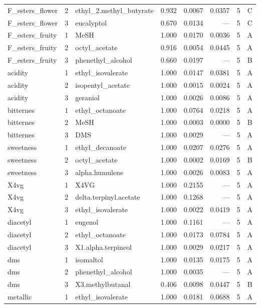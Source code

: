 \begin{longtable}{@{}p{} r p{} r r r r c@{}}
F\_esters\_flower & 2 & ethyl\_2.\allowbreak{}methyl\_butyrate & 0.932 & 0.0067 & 0.0357 & 5 & C \\
F\_esters\_flower & 3 & eucalyptol & 0.670 & 0.0134 & --- & 5 & C \\
F\_esters\_fruity & 1 & MeSH & 1.000 & 0.0170 & 0.0036 & 5 & A \\
F\_esters\_fruity & 2 & octyl\_acetate & 0.916 & 0.0054 & 0.0445 & 5 & A \\
F\_esters\_fruity & 3 & phenethyl\_alcohol & 0.660 & 0.0197 & --- & 5 & B \\
acidity & 1 & ethyl\_isovalerate & 1.000 & 0.0147 & 0.0381 & 5 & A \\
acidity & 2 & isopentyl\_acetate & 1.000 & 0.0015 & 0.0024 & 5 & A \\
acidity & 3 & geraniol & 1.000 & 0.0026 & 0.0086 & 5 & A \\
bitternes & 1 & ethyl\_octanoate & 1.000 & 0.0764 & 0.0218 & 5 & A \\
bitternes & 2 & MeSH & 1.000 & 0.0003 & 0.0000 & 5 & B \\
bitternes & 3 & DMS & 1.000 & 0.0029 & --- & 5 & A \\
sweetness & 1 & ethyl\_decanoate & 1.000 & 0.0207 & 0.0276 & 5 & A \\
sweetness & 2 & octyl\_acetate & 1.000 & 0.0002 & 0.0169 & 5 & B \\
sweetness & 3 & alpha.\allowbreak{}humulene & 1.000 & 0.0026 & 0.0083 & 5 & A \\
X4vg & 1 & X4VG & 1.000 & 0.2155 & --- & 5 & A \\
X4vg & 2 & delta.\allowbreak{}terpinyl.\allowbreak{}acetate & 1.000 & 0.1268 & --- & 5 & A \\
X4vg & 3 & ethyl\_isovalerate & 1.000 & 0.0022 & 0.0419 & 5 & A \\
diacetyl & 1 & eugenol & 1.000 & 0.1161 & --- & 5 & A \\
diacetyl & 2 & ethyl\_octanoate & 1.000 & 0.0173 & 0.0784 & 5 & A \\
diacetyl & 3 & X1.\allowbreak{}alpha.\allowbreak{}terpineol & 1.000 & 0.0029 & 0.0217 & 5 & A \\
dms & 1 & isomaltol & 1.000 & 0.0135 & 0.0175 & 5 & A \\
dms & 2 & phenethyl\_alcohol & 1.000 & 0.0035 & --- & 5 & A \\
dms & 3 & X3.\allowbreak{}methylbutanal & 0.406 & 0.0098 & 0.0447 & 5 & B \\
metallic & 1 & ethyl\_isovalerate & 1.000 & 0.0181 & 0.0688 & 5 & A \\

\end{longtable}
